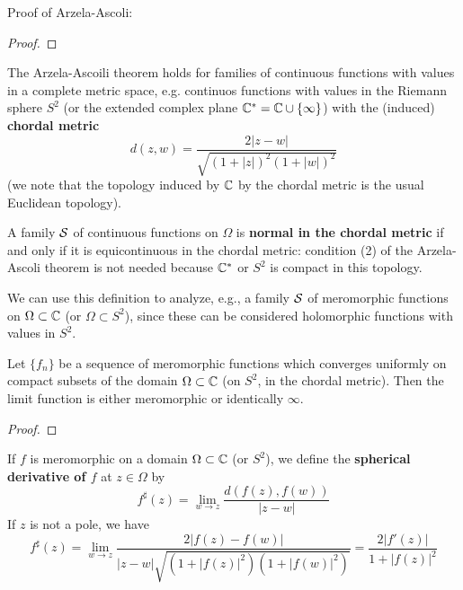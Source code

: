 \documentclass{article}
\begin{document}
Proof of Arzela-Ascoli:
\begin{proof}


\end{proof}
The Arzela-Ascoili theorem holds for families of continuous functions with values in a complete metric space, e.g. continuos functions with values in the Riemann sphere \(S^2\) (or the extended complex plane \(\mathbb{C}^* = \mathbb{C} \cup \{\infty\}\)) with the (induced) \textbf{chordal metric}
\begin{equation}d(z, w) = \frac{2|z - w|}{\sqrt{(1 + |z|)^2(1 + |w|)^2}}\end{equation}
(we note that the topology induced by \(\mathbb{C}\) by the chordal metric is the usual Euclidean topology).
\begin{definition}
A family \(\mathcal{S}\) of continuous functions on \(\Omega\) is \textbf{normal in the chordal metric} if and only if it is equicontinuous in the chordal metric: condition (2) of the Arzela-Ascoli theorem is not needed because \(\mathbb{C}^*\) or \(S^2\) is compact in this topology.
\end{definition}
We can use this definition to analyze, e.g., a family \(\mathcal{S}\) of meromorphic functions on \(\Omega \subset \mathbb{C}\) (or \(\Omega \subset S^2\)), since these can be considered holomorphic functions with values in \(S^2\).
\begin{lemma}
Let \(\{f_n\}\) be a sequence of meromorphic functions which converges uniformly on compact subsets of the domain \(\Omega \subset \mathbb{C}\) (on \(S^2\), in the chordal metric). Then the limit function is either meromorphic or identically \(\infty\).
\end{lemma}
\begin{proof}
\end{proof}
\begin{definition}
If \(f\) is meromorphic on a domain \(\Omega \subset \mathbb{C}\) (or \(S^2\)), we define the \textbf{spherical derivative of \(f\)} at \(z \in \Omega\) by
\begin{equation}f^\sharp(z) = \lim_{w \to z}\frac{d(f(z), f(w))}{|z - w|}\end{equation}
If \(z\) is not a pole, we have
\begin{equation}f^\sharp(z) = \lim_{w \to z}\frac{2|f(z) - f(w)|}{|z - w|\sqrt{(1 + |f(z)|^2)(1 + |f(w)|^2)}} = \frac{2|f'(z)|}{1 + |f(z)|^2}\end{equation}
\end{definition}
\end{document}
